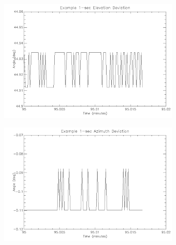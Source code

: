 \newpage
\begin{figure}[htbp]
\captionsetup[subfigure]{justification=centering}
\captionsetup{justification=centering}
    \centering
	\begin{subfigure}{0.45\textwidth}
		\includegraphics[width=1\linewidth]{appendix/img/campaign_results/latealt1sec.png}
		\caption{}
		\label{fig:sub:latealt1}
	\end{subfigure}
	\begin{subfigure}{0.45\textwidth}
		\includegraphics[width=1\linewidth]{appendix/img/campaign_results/lateaz1sec.png}
		\caption{}
		\label{fig:sub:lateaz1}
	\end{subfigure}
	\begin{subfigure}{0.45\textwidth}

\end{subfigure}
\end{figure}
